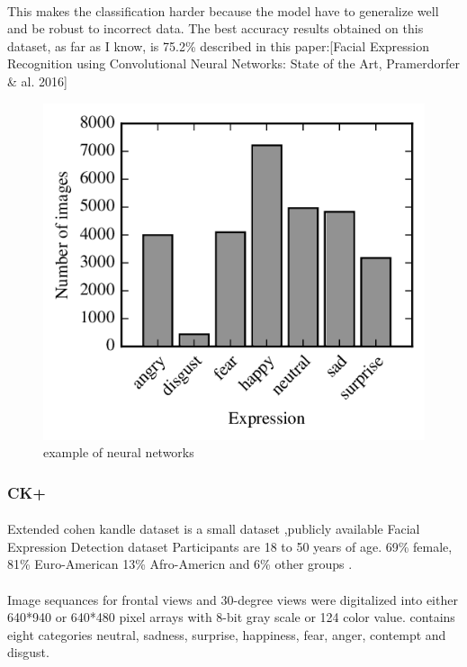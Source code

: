 \paragraph{}
This makes the classification harder because the model have to generalize well and be robust to incorrect data. The best accuracy results obtained on this dataset, as far as I know, is 75.2\% described in this paper:\cite{state_of_art}[Facial Expression Recognition using Convolutional Neural Networks: State of the Art, Pramerdorfer \& al. 2016]
\begin{figure}
	\centering
	\includegraphics[width=.5\textwidth]{fer_dis.png}
	\caption{example of neural networks}
\end{figure} 
\subsubsection{CK+}
\paragraph{}
Extended cohen kandle dataset is a small dataset ,publicly available Facial Expression Detection dataset Participants are 18 to 50 years of age. 69\% female, 81\% Euro-American 
13\% Afro-Americn and 6\% other groups .
\paragraph{}
Image sequances for frontal views and 30-degree views were digitalized into either 640*940 or 640*480 pixel arrays with 8-bit gray scale or 124 color value.
contains eight categories neutral, sadness, surprise, happiness, fear, anger, contempt and disgust.	

